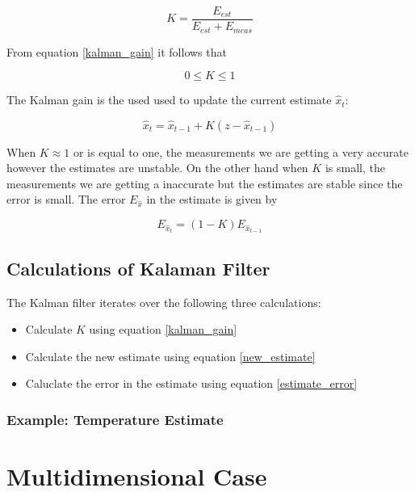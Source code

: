\begin{equation}
K = \frac{E_{est}}{E_{est} + E_{meas}}
\label{kalman_gain}
\end{equation} 

From equation \ref{kalman_gain} it follows that

\begin{equation}
0 \leq K \leq 1
\label{kalman_gain_condition}
\end{equation} 

The Kalman gain is the used used to update the current estimate $\hat{x}_t$:

\begin{equation}
\hat{x}_t = \hat{x}_{t-1} + K (z - \hat{x}_{t-1})
\label{new_estimate}
\end{equation} 


When $K \approx 1$ or is equal to one, the measurements we are getting a very accurate however the estimates are unstable. On the other hand when $K$ is small, 
the measurements we are getting a inaccurate but the estimates are stable since the error is small.
The error $E_{\hat{x}}$ in the estimate is given by 

\begin{equation}
E_{\hat{x}_t} = (1-K)E_{\hat{x}_{t-1}}
\label{estimate_error}
\end{equation}

\subsection{Calculations of Kalaman Filter}
The Kalman filter iterates over the following three calculations:

\begin{itemize}
\item Calculate $K$ using equation \ref{kalman_gain}
\item Calculate the new estimate using equation \ref{new_estimate} 
\item Caluclate the error in the estimate using equation \ref{estimate_error}
\end{itemize}

\subsubsection{Example: Temperature Estimate}


\section{Multidimensional Case}

